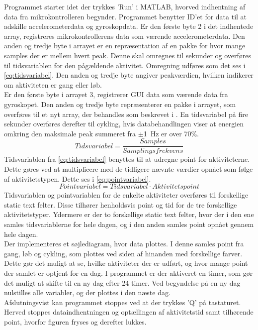 Programmet starter idet der trykkes 'Run' i MATLAB, hvorved indhentning af data fra mikrokontrolleren begynder. Programmet benytter ID'et for data til at adskille accelerometerdata og gyroskopdata. Er den første byte 2 i det indhentede array, registreres mikrokontrollerens data som værende accelerometerdata. Den anden og tredje byte i arrayet er en repræsentation af en pakke for hvor mange samples der er mellem hvert peak. Denne skal omregnes til sekunder og overføres til tidsvariablen for den pågældende aktivitet. Omregning udføres som det ses i \eqref{eq:tidsvariabel}. Den anden og tredje byte angiver peakværdien, hvilken indikerer om aktiviteten er gang eller løb. \\
Er den første byte i arrayet 3, registrerer GUI data som værende data fra gyroskopet. Den anden og tredje byte repræsenterer en pakke i arrayet, som overføres til et nyt array, der behandles som beskrevet i . En tidsvariabel på fire sekunder overføres derefter til cykling, hvis databehandlingen viser at energien omkring den maksimale peak summeret fra $\pm$1~Hz er over 70\%. 
\begin{equation}
Tidsvariabel = \frac{Samples}{Samplingsfrekvens}
\label{eq:tidsvariabel}
\end{equation}
Tidsvariablen fra \eqref{eq:tidsvariabel} benyttes til at udregne point for aktiviteterne. Dette gøres ved at multiplicere med de tidligere nævnte værdier opnået som følge af aktivitetstypen. Dette ses i \eqref{eq:pointvariabel}. 
\begin{equation}
Pointvariabel = Tidsvariabel \cdot Aktivitetspoint
\label{eq:pointvariabel}
\end{equation}
Tidsvariablen og pointvariablen for de enkelte aktiviteter overføres til forskellige static text felter. Disse tilhører henholdsvis point og tid for de tre forskellige aktivitetstyper. Ydermere er der to forskellige static text felter, hvor der i den ene samles tidsvariablerne for hele dagen, og i den anden samles point opnået gennem hele dagen. \\
Der implementeres et søjlediagram, hvor data plottes. I denne samles point fra gang, løb og cykling, som plottes ved siden af hinanden med forskellige farver. Dette gør det muligt at se, hvilke aktiviteter der er udført, og hvor mange point der samlet er optjent for en dag. I programmet er der aktiveret en timer, som gør det muligt at skifte til en ny dag efter 24 timer. Ved begyndelse på en ny dag nulstilles alle variabler, og der plottes i den næste dag.\\ 
Afslutningsvist kan programmet stoppes ved at der trykkes 'Q' på tastaturet. Herved stoppes dataindhentningen og optællingen af aktivitetstid samt tilhørende point, hvorfor figuren fryses og derefter lukkes. 

